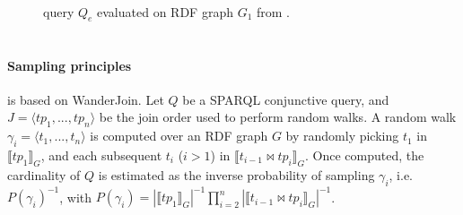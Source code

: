 

\begin{figure}[t]
  \centering
  \begin{minipage}{0.49\textwidth}
    \subfloat[$(Q_e)$]{
      
      \label{fig:q1-j2-1hop}
    } \\
  \end{minipage}
  \hfill
  \begin{minipage}{0.45\textwidth}
  \end{minipage}
  \caption{
    query $Q_e$  evaluated on RDF graph $G_1$ from \cite{10.1007/978-3-031-33455-9_3}.
  }
  \label{fig:random_walks_example}
\end{figure}



\section{\NAME}


\paragraph{Sampling principles}

\NAME is based on WanderJoin\cite{li2019wanderjoin}.
Let $Q$ be a SPARQL conjunctive query, and $J = \langle tp_1, ..., tp_n \rangle$ be
the join order used to perform random walks. A random walk
$\gamma_i = \langle t_1, ..., t_n\rangle$ is computed over
an RDF graph $G$ by randomly picking $t_1$ in $\llbracket tp_1 \rrbracket_G$,
and each subsequent $t_i$ ($i > 1$) in $\llbracket t_{i-1} \bowtie tp_i \rrbracket_G$.
Once computed, the cardinality of $Q$ is estimated as the inverse probability
of sampling $\gamma_i$, i.e. $P(\gamma_i)^{-1}$, with $P(\gamma_i) = |\llbracket tp_1 \rrbracket_G|^{-1} \prod_{i=2}^{n}
|\llbracket t_{i-1} \bowtie tp_i \rrbracket_G|^{-1}$.

